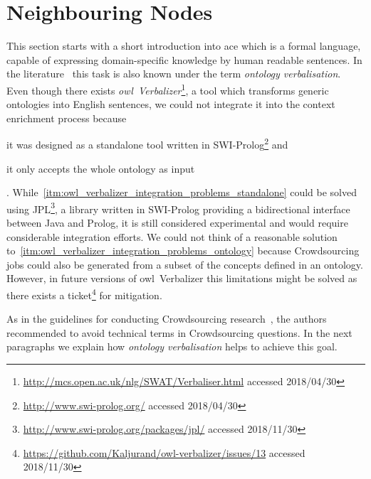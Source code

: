 
\section{Neighbouring Nodes}\label{sec:neighboring_nodes}
This section starts with a short introduction into \gls{ace} which is a formal language, capable of expressing domain-specific knowledge by human readable sentences. In the literature~\cite{soton265735} this task is also known under the term \textit{ontology verbalisation}. Even though there exists \textit{\gls{owl}~Verbalizer}\footnote{\url{http://mcs.open.ac.uk/nlg/SWAT/Verbaliser.html} accessed 2018/04/30}, a tool which transforms generic ontologies into English sentences, we could not integrate it into the context enrichment process because 
\begin{inparaenum}[1)]
		\item \label{itm:owl_verbalizer_integration_problems_standalone} it was designed as a standalone tool written in SWI-Prolog\footnote{\url{http://www.swi-prolog.org/} accessed 2018/04/30} and
		\item \label{itm:owl_verbalizer_integration_problems_ontology} it only accepts the whole ontology as input
\end{inparaenum}. While~\ref{itm:owl_verbalizer_integration_problems_standalone} could be solved using JPL\footnote{\url{http://www.swi-prolog.org/packages/jpl/} accessed 2018/11/30}, a library written in SWI-Prolog providing a bidirectional interface between Java and Prolog, it is still considered experimental and would require considerable integration efforts. We could not think of a reasonable solution to~\ref{itm:owl_verbalizer_integration_problems_ontology} because Crowdsourcing jobs could also be generated from a subset of the concepts defined in an ontology. However, in future versions of \gls{owl}~Verbalizer this limitations might be solved as there exists a ticket\footnote{\url{https://github.com/Kaljurand/owl-verbalizer/issues/13} accessed 2018/11/30} for mitigation. 

As in the guidelines for conducting Crowdsourcing research~\cite{sarasua2015crowdsourcing}, the authors recommended to avoid technical terms in Crowdsourcing questions. In the next paragraphs we explain how \textit{ontology verbalisation} helps to achieve this goal. 

